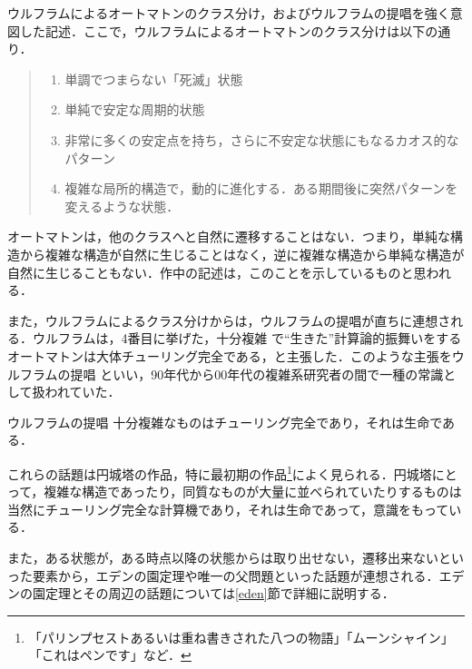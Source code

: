 \documentclass[10pt, a5paper, twoside]{ltjsarticle}
\begin{document}
            ウルフラムによるオートマトンのクラス分け，およびウルフラムの提唱を強く意図した記述．ここで，ウルフラムによるオートマトンのクラス分けは以下の通り\cite{bio}．

            \begin{quote}
                \begin{enumerate}
                    \item 単調でつまらない「死滅」状態
                    \item 単純で安定な周期的状態
                    \item 非常に多くの安定点を持ち，さらに不安定な状態にもなるカオス的なパターン
                    \item 複雑な局所的構造で，動的に進化する．ある期間後に突然パターンを変えるような状態．
                \end{enumerate}
		    \end{quote}

            オートマトンは，他のクラスへと自然に遷移することはない．つまり，単純な構造から複雑な構造が自然に生じることはなく，逆に複雑な構造から単純な構造が自然に生じることもない．作中の記述は，このことを示しているものと思われる．

            また，ウルフラムによるクラス分けからは，ウルフラムの提唱が直ちに連想される．ウルフラムは，4番目に挙げた，十分複雑%
            で“生きた”計算論的振舞いをするオートマトンは大体チューリング完全である，と主張した．このような主張をウルフラムの提唱%
            といい，90年代から00年代の複雑系研究者の間で一種の常識として扱われていた．

            \begin{ths}{ウルフラムの提唱}{}
    			十分複雑なものはチューリング完全であり，それは生命である．
		    \end{ths}

            これらの話題は円城塔の作品，特に最初期の作品\footnote{「パリンプセストあるいは重ね書きされた八つの物語」「ムーンシャイン」「これはペンです」など．}によく見られる．円城塔にとって，複雑な構造であったり，同質なものが大量に並べられていたりするものは当然にチューリング完全な計算機であり，それは生命であって，意識をもっている．

            また，ある状態が，ある時点以降の状態からは取り出せない，遷移出来ないといった要素から，エデンの園定理や唯一の父問題といった話題が連想される．エデンの園定理とその周辺の話題については\ref{eden}節で詳細に説明する．
\end{document}
